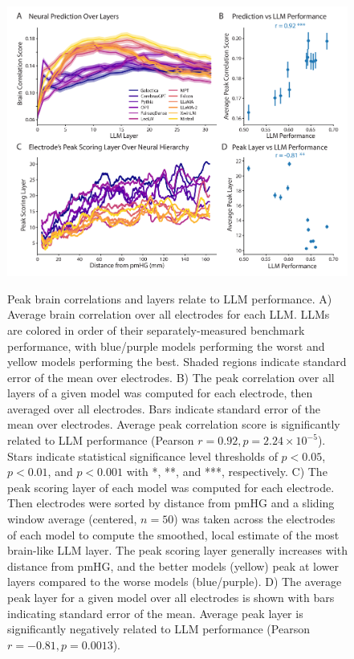 \begin{figure}[!t]
  \centering
  {\includegraphics[width=0.95\linewidth]{figures/Figure_peakscores-peaklayers-01.png}}
  \caption{Peak brain correlations and layers relate to LLM performance. A) Average brain correlation over all electrodes for each LLM. LLMs are colored in order of their separately-measured benchmark performance, with blue/purple models performing the worst and yellow models performing the best. Shaded regions indicate standard error of the mean over electrodes. B) The peak correlation over all layers of a given model was computed for each electrode, then averaged over all electrodes. Bars indicate standard error of the mean over electrodes. Average peak correlation score is significantly related to LLM performance (Pearson $r=0.92, p=2.24\times10^{-5}$). Stars indicate statistical significance level thresholds of $p<0.05$, $p<0.01$, and $p<0.001$ with *, **, and ***, respectively. C) The peak scoring layer of each model was computed for each electrode. Then electrodes were sorted by distance from pmHG and a sliding window average (centered, $n=50$) was taken across the electrodes of each model to compute the smoothed, local estimate of the most brain-like LLM layer. The peak scoring layer generally increases with distance from pmHG, and the better models (yellow) peak at lower layers compared to the worse models (blue/purple). D) The average peak layer for a given model over all electrodes is shown with bars indicating standard error of the mean. Average peak layer is significantly negatively related to LLM performance (Pearson $r=-0.81, p=0.0013$).}
  \label{fig:2}
\end{figure}

